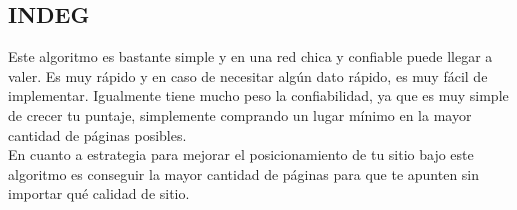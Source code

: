 \subsection{INDEG}
Este algoritmo es bastante simple y en una red chica y confiable puede llegar a valer. Es muy rápido y en caso de necesitar algún dato rápido, es muy fácil de implementar. Igualmente tiene mucho peso la confiabilidad, ya que es muy simple de crecer tu puntaje, simplemente comprando un lugar mínimo en la mayor cantidad de páginas posibles.\\
En cuanto a estrategia para mejorar el posicionamiento de tu sitio bajo este algoritmo es conseguir la mayor cantidad de páginas para que te apunten sin importar qué calidad de sitio.







